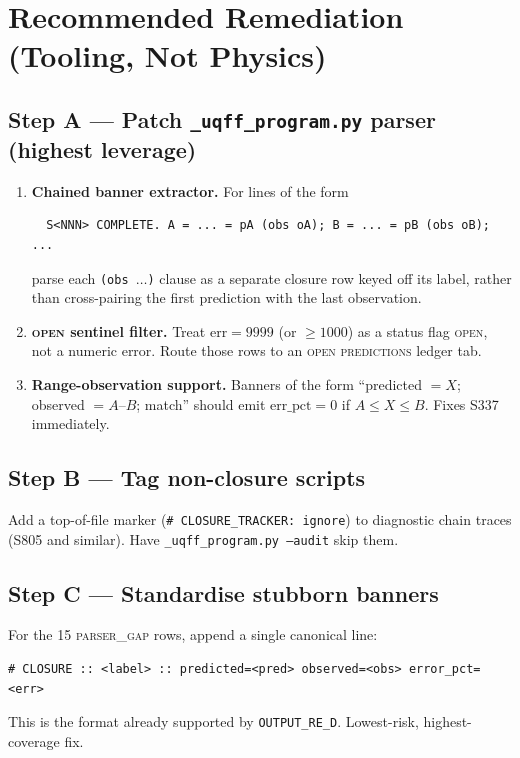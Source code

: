\documentclass[11pt]{article}
\begin{document}
\section{Recommended Remediation (Tooling, Not Physics)}

\subsection*{Step A --- Patch \texttt{\_uqff\_program.py} parser (highest leverage)}
\begin{enumerate}
  \item \textbf{Chained banner extractor.} For lines of the form
  \begin{verbatim}
  S<NNN> COMPLETE. A = ... = pA (obs oA); B = ... = pB (obs oB); ...
  \end{verbatim}
  parse each \texttt{(obs $\ldots$)} clause as a separate closure row keyed off its label, rather than cross-pairing the first prediction with the last observation.
  \item \textbf{\textsc{open} sentinel filter.} Treat $\mathrm{err} = 9999$ (or $\ge 1000$) as a status flag \textsc{open}, not a numeric error. Route those rows to an \textsc{open predictions} ledger tab.
  \item \textbf{Range-observation support.} Banners of the form ``predicted $= X$; observed $= A$--$B$; match'' should emit $\mathrm{err\_pct} = 0$ if $A \le X \le B$. Fixes S337 immediately.
\end{enumerate}

\subsection*{Step B --- Tag non-closure scripts}
Add a top-of-file marker (\texttt{\# CLOSURE\_TRACKER: ignore}) to diagnostic chain traces (S805 and similar). Have \texttt{\_uqff\_program.py --audit} skip them.

\subsection*{Step C --- Standardise stubborn banners}
For the 15 \textsc{parser\_gap} rows, append a single canonical line:
\begin{verbatim}
# CLOSURE :: <label> :: predicted=<pred> observed=<obs> error_pct=<err>
\end{verbatim}
This is the format already supported by \texttt{OUTPUT\_RE\_D}. Lowest-risk, highest-coverage fix.
\end{document}

